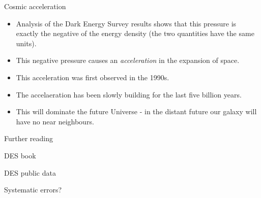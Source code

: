 \documentclass[usenames,dvipsnames]{beamer}
\begin{document}
\begin{frame}{Cosmic acceleration}
  \begin{block}{}
    \begin{itemize}
      \item{Analysis of the Dark Energy Survey results shows that this pressure is exactly the negative of the energy density (the two quantities have the same units).}
      \item{This negative pressure causes an \textit{acceleration} in the expansion of space.}
      \item{This acceleration was first observed in the 1990s.}
      \item{The accelaeration has been slowly building for the last five billion years.}
      \item{This will dominate the future Universe - in the distant future our galaxy will have no near neighbours.}
    \end{itemize}
  \end{block}
\end{frame}

Further reading

DES book

DES public data

Systematic errors?
\end{document}

